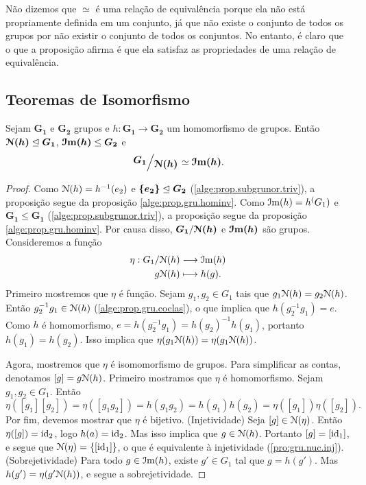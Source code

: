 Não dizemos que $\simeq$ é uma relação de equivalência porque ela não está propriamente definida em um conjunto, já que não existe o conjunto de todos os grupos por não existir o conjunto de todos os conjuntos. No entanto, é claro que o que a proposição afirma é que ela satisfaz as propriedades de uma relação de equivalência.

\subsection{Teoremas de Isomorfismo}

\begin{teo}
Sejam $\bm{G_1}$ e $\bm{G_2}$ grupos e $h: \bm{G_1} \to \bm{G_2}$ um homomorfismo de grupos. Então $\bm{\mathcal{N}(h)} \mathrel{\unlhd} \bm{G_1}$, $\bm{\mathcal{I}\mathrm{m}(h)} \leq \bm{G_2}$ e 
	\begin{equation*}
	\bm{\quo{G_1}{\nuc(h)}} \simeq \bm{\im(h)}.
	\end{equation*}
\end{teo}
\begin{proof} Como $\mathcal{N}(h) = h^{-1}(e_2)$ e $\bm{\{e_2\}} \mathrel{\unlhd} \bm{G_2}$ (\ref{alge:prop.subgrunor.triv}), a proposição segue da proposição \ref{alge:prop.gru.hominv}. Como $\mathcal{I}\mathrm{m}(h) = h^(G_1)$ e $\bm{G_1} \leq \bm{G_1}$ (\ref{alge:prop.subgrunor.triv}), a proposição segue da proposição \ref{alge:prop.gru.hominv}. Por causa disso, $\bm{G_1}/\bm{\mathcal{N}(h)}$ e $\bm{\mathcal{I}\mathrm{m}(h)}$ são grupos. Consideremos a função
		\begin{align*}
		{\eta}: {G_1 / \mathcal{N}(h)} &\longrightarrow {\mathcal{I}\mathrm{m}(h)} \\{g\mathcal{N}(h)} &\longmapsto {h(g)}.
		\end{align*}
Primeiro mostremos que $\eta$ é função. Sejam $g_1,g_2 \in G_1$ tais que $g_1\mathcal{N}(h) = g_2\mathcal{N}(h)$. Então $g_2^{-1}g_1 \in \mathcal{N}(h)$ (\ref{alge:prop.gru.coclas}), o que implica que $h(g_2^{-1}g_1) = e$. Como $h$ é homomorfismo, $e = h(g_2^{-1}g_1) = h(g_2)^{-1}h(g_1)$, portanto $h(g_1)=h(g_2)$. Isso implica que $\eta(g_1\mathcal{N}(h))=\eta(g_1\mathcal{N}(h))$.

Agora, mostremos que $\eta$ é isomomorfismo de grupos. Para simplificar as contas, denotamos $[g] = g\mathcal{N}(h)$. Primeiro mostramos que $\eta$ é homomorfismo. Sejam $g_1,g_2 \in G_1$. Então
	\begin{equation*}
	\eta([g_1][g_2]) = \eta([g_1g_2]) = h(g_1g_2) = h(g_1)h(g_2) = \eta([g_1])\eta([g_2]).
	\end{equation*}
Por fim, devemos mostrar que $\eta$ é bijetivo. (Injetividade) Seja $[g] \in \mathcal{N}(\eta)$. Então $\eta([g])=\mathrm{id}_{2}$, logo $h(a)=\mathrm{id}_2$. Mas isso implica que $g \in \mathcal{N}(h)$. Portanto $[g]=[\mathrm{id}_1]$, e segue que $\mathcal{N}(\eta)=\{[\mathrm{id}_1]\}$, o que é equivalente à injetividade (\ref{pro:gru.nuc.inj}). (Sobrejetividade) Para todo $g \in \mathcal{I}\mathrm{m}(h)$, existe $g' \in G_1$ tal que $g=h(g')$. Mas $h(g')=\eta(g'\mathcal{N}(h))$, e segue a sobrejetividade.
\end{proof}

